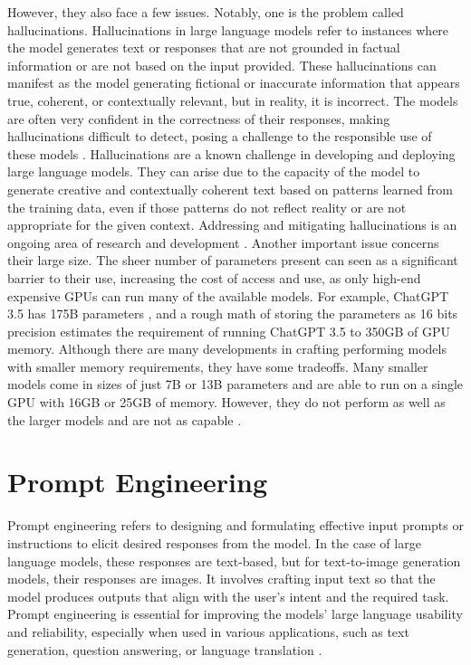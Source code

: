 However, they also face a few issues. Notably, one is the problem called hallucinations. Hallucinations in large language models refer to instances where the model generates text or responses that are not grounded in factual information or are not based on the input provided. These hallucinations can manifest as the model generating fictional or inaccurate information that appears true, coherent, or contextually relevant, but in reality, it is incorrect. The models are often very confident in the correctness of their responses, making hallucinations difficult to detect, posing a challenge to the responsible use of these models \cite{alkaissi2023artificial,azamfirei2023large}. Hallucinations are a known challenge in developing and deploying large language models. They can arise due to the capacity of the model to generate creative and contextually coherent text based on patterns learned from the training data, even if those patterns do not reflect reality or are not appropriate for the given context. Addressing and mitigating hallucinations is an ongoing area of research and development \cite{gunjal2023detecting,mundler2023self,peng2023check}. Another important issue concerns their large size. The sheer number of parameters present can seen as a significant barrier to their use, increasing the cost of access and use, as only high-end expensive GPUs can run many of the available models. For example, ChatGPT 3.5 has 175B parameters \cite{chatgpt-parameters}, and a rough math of storing the parameters as 16 bits precision estimates the requirement of running ChatGPT 3.5 to 350GB of GPU memory. Although there are many developments in crafting performing models with smaller memory requirements, they have some tradeoffs. Many smaller models come in sizes of just 7B or 13B parameters and are able to run on a single GPU with 16GB or 25GB of memory. However, they do not perform as well as the larger models and are not as capable \cite{touvronllama,falcon40b,mpt7b,wizard-vicuna}. 

\section{Prompt Engineering}

Prompt engineering refers to designing and formulating effective input prompts or instructions to elicit desired responses from the model. In the case of large language models, these responses are text-based, but for text-to-image generation models, their responses are images. It involves crafting input text so that the model produces outputs that align with the user's intent and the required task. Prompt engineering is essential for improving the models' large language usability and reliability, especially when used in various applications, such as text generation, question answering, or language translation \cite{white2023prompt,zhou2022learning,oppenlaender2022prompt,reynolds2021prompt,zhou-etal-2022-prompt}. 

